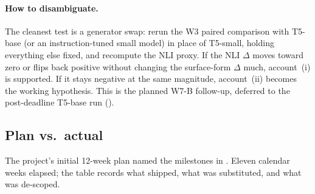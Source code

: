 \documentclass[11pt,a4paper]{article}
\begin{document}
\paragraph{How to disambiguate.}  The cleanest test is a generator
swap: rerun the W3 paired comparison with T5-base (or an
instruction-tuned small model) in place of T5-small, holding
everything else fixed, and recompute the NLI proxy.  If the NLI
$\Delta$ moves toward zero or flips back positive without changing
the surface-form $\Delta$ much, account~(i) is supported.  If it
stays negative at the same magnitude, account~(ii) becomes the
working hypothesis.  This is the planned W7-B follow-up, deferred
to the post-deadline T5-base run ().

\subsection{Plan vs.\ actual}
\label{sec:plan-vs-actual}

The project's initial 12-week plan named the milestones in
.  Eleven calendar weeks elapsed; the
table records what shipped, what was substituted, and what was
de-scoped.
\end{document}
